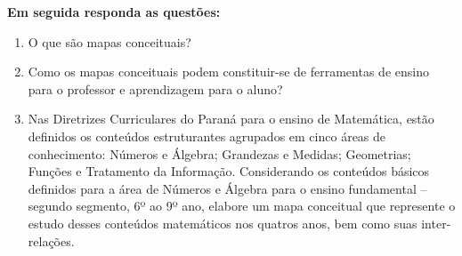 \documentclass[a4paper, 12pt]{article}
\begin{document}
\begin{enumerate}
  \textbf{Em seguida responda as questões:}
  \begin{enumerate}
  \item O que são mapas conceituais?
  \item Como os mapas conceituais podem constituir-se de ferramentas de ensino para o professor e aprendizagem para o aluno?
  \item Nas Diretrizes Curriculares do Paraná para o ensino de Matemática, estão definidos os conteúdos estruturantes agrupados em cinco áreas de conhecimento: Números e Álgebra; Grandezas e Medidas; Geometrias; Funções e Tratamento da Informação. Considerando os conteúdos básicos definidos para a área de Números e Álgebra para o ensino fundamental – segundo segmento, 6º ao 9º ano, elabore um mapa conceitual que represente o estudo desses conteúdos matemáticos nos quatros anos, bem como suas inter-relações.
  \end{enumerate}   
\end{enumerate}
\end{document}
